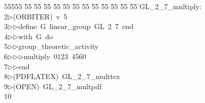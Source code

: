 %
%
\begin{tabbing}
55555 \= 55 \= 55 \= 55 \= 55 \= 55 \= 55 \= 55 \= 55 \= 55 \= 55 \= 55 \= 55 \= \>GL\_2\_7\_multiply:\\[0pt]
2\>$\triangleright$\>(ORBITER)\ v\ 5\ \\[0pt]
3\>$\triangleright$\>$\triangleright$\>define\ G\ linear\_group\ GL\ 2\ 7\ end\ \\[0pt]
4\>$\triangleright$\>$\triangleright$\>with\ G\ do\ \\[0pt]
5\>$\triangleright$\>$\triangleright$\>group\_theoretic\_activity\ \\[0pt]
6\>$\triangleright$\>$\triangleright$\>$\triangleright$\>multiply\ 0123\ 4560\ \\[0pt]
7\>$\triangleright$\>$\triangleright$\>end\\[0pt]
8\>$\triangleright$\>(PDFLATEX)\ GL\_2\_7\_multtex\\[0pt]
9\>$\triangleright$\>(OPEN)\ GL\_2\_7\_multpdf\\[0pt]
10\>\end{tabbing}
